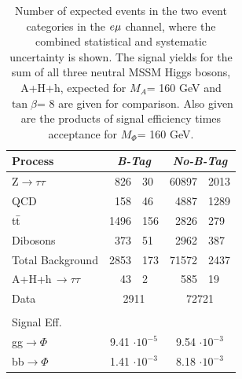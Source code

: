 \begin{table}[!h]
  \begin{center}
    \caption{Number of expected events in the two event categories in the $e\mathrm{\mu}$ channel, where the combined statistical and systematic uncertainty is shown. 
      The signal yields for the sum of all three neutral MSSM Higgs bosons, A+H+h, expected for $M_{A}$= 160 GeV and $\tan\beta$= 8 are given for comparison.
      Also given are the products of signal efficiency times acceptance for $M_{\Phi}$= 160 GeV.}
\begin{tabular}{|l|r@{$ \,\,\pm\,\, $}l|r@{$ \,\,\pm\,\, $}l|} 
\hline 
Process & \multicolumn{2}{c|}{\emph{B-Tag}} & \multicolumn{2}{c|}{\emph{No-B-Tag}}\\ 
\hline 
Z$\rightarrow \tau\tau$          &       826     &       30      &       60897   &       2013    \\ 
\hline 
QCD                              &       158     &       46      &       4887    &       1289    \\ 
\hline 
t$\bar{\rm{t}}$                  &       1496    &       156     &       2826    &       279     \\ 
\hline 
Dibosons                         &       373     &       51      &       2962    &       387     \\ 
\hline 
\hline 
Total Background                 &       2853    &       173     &       71572   &       2437    \\ 
\hline 
A+H+h\,$\rightarrow\tau\tau$           &       43      &       2     &       585     &       19       \\ 
\hline 
Data                             & \multicolumn{2}{|c|}{2911}    & \multicolumn{2}{|c|}{72721}   \\ 
\hline 
\multicolumn{5}{c}{ } \\
\multicolumn{2}{l}{Signal Eff.} &  \multicolumn{3}{c}{ } \\
\hline
gg$\rightarrow\Phi$               &       \multicolumn{2}{|c|}{9.41 $\cdot 10^{-5}$}      &       \multicolumn{2}{|c|}{9.54 $\cdot 10^{-3}$}\\ 
\hline 
bb$\rightarrow\Phi$               &       \multicolumn{2}{|c|}{1.41 $\cdot 10^{-3}$}      &       \multicolumn{2}{|c|}{8.18 $\cdot 10^{-3}$}\\ 
\hline 
\end{tabular} 
\label{table:events_emu} 
\end{center} 
\end{table} 

